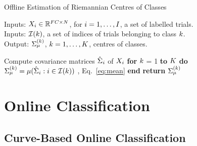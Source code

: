 \begin{algorithm}
\caption{Offline Estimation of Riemannian Centres of Classes}
\label{alg:r_mean}
	Inputs: $X_{i} \in \mathbb{R}^{F C\times N}$, for $i = 1, \ldots, I$, a set of labelled trials. \\
	Inputs: $\mathcal{I}(k)$, a set of indices of trials belonging to class $k$. \\
	Output: $\Sigma_{\mu}^{(k)}$, $k = 1, \ldots, K$, centres of classes.
	\begin{algorithmic}[1]
	\State Compute covariance matrices $\hat{\Sigma}_{\operatorname{\textit{\ensuremath{i}}}}$ of $X_{i}$ %
	\label{op:cov_i}
	\State \textbf{for} $k$ = 1 \textbf{to} $K$ \textbf{do}
	\State \quad $\Sigma_{\mu}^{(k)}=\mu(\hat{\Sigma}_{\operatorname{\textit{\ensuremath{i}}}}:i \in \mathcal{I}(k))$ , Eq.~\eqref{eq:mean}
	\label{op:class_center}
	\State \textbf{end}
	\State \textbf{return} $\Sigma_{\mu}^{(k)}$ 
	\end{algorithmic}
\end{algorithm}

\section{Online Classification}
\label{sec:online-classification}

\subsection{Curve-Based Online Classification} %

